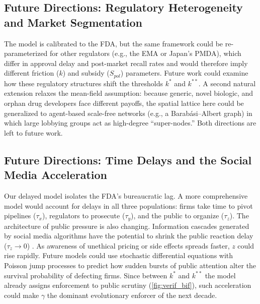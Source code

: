 \documentclass[10pt]{article}
\begin{document}
\subsection{Future Directions: Regulatory Heterogeneity and Market Segmentation}
The model is calibrated to the FDA, but the same framework could be re-parameterized for other regulators (e.g., the EMA or Japan's PMDA), which differ in approval delay and post-market recall rates and would therefore imply different friction ($k$) and subsidy ($S_{pol}$) parameters. Future work could examine how these regulatory structures shift the thresholds $k^*$ and $k^{**}$. A second natural extension relaxes the mean-field assumption: because generic, novel biologic, and orphan drug developers face different payoffs, the spatial lattice here could be generalized to agent-based scale-free networks (e.g., a Barab\'asi--Albert graph) in which large lobbying groups act as high-degree ``super-nodes.'' Both directions are left to future work.

\subsection{Future Directions: Time Delays and the Social Media Acceleration}
Our delayed model isolates the FDA's bureaucratic lag. A more comprehensive model would account for delays in all three populations: firms take time to pivot pipelines ($\tau_x$), regulators to prosecute ($\tau_y$), and the public to organize ($\tau_z$). The architecture of public pressure is also changing. Information cascades generated by social media algorithms have the potential to shrink the public reaction delay ($\tau_z \rightarrow 0$) \cite{bollen2011}. As awareness of unethical pricing or side effects spreads faster, $z$ could rise rapidly. Future models could use stochastic differential equations with Poisson jump processes to predict how sudden bursts of public attention alter the survival probability of defecting firms. Since between $k^*$ and $k^{**}$ the model already assigns enforcement to public scrutiny (\cref{fig:verif_bif}), such acceleration could make $\gamma$ the dominant evolutionary enforcer of the next decade.
\end{document}
